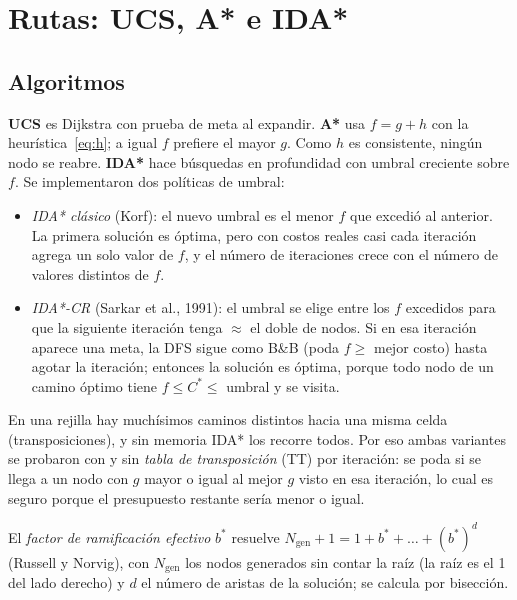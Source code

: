 \documentclass[11pt]{article}
\theoremstyle{remark}
\begin{document}
\section{Rutas: UCS, A* e IDA*}

\subsection{Algoritmos}
\textbf{UCS} es Dijkstra con prueba de meta al expandir. \textbf{A*} usa $f=g+h$ con la
heurística~\eqref{eq:h}; a igual $f$ prefiere el mayor $g$. Como $h$ es consistente, ningún nodo se
reabre. \textbf{IDA*} hace búsquedas en profundidad con umbral creciente sobre $f$. Se implementaron
dos políticas de umbral:
\begin{itemize}
\item \emph{IDA* clásico} (Korf): el nuevo umbral es el menor $f$ que excedió al anterior. La primera
solución es óptima, pero con costos reales casi cada iteración agrega un solo valor de $f$, y el
número de iteraciones crece con el número de valores distintos de $f$.
\item \emph{IDA*-CR} (Sarkar et al., 1991): el umbral se elige entre los $f$ excedidos para que la
siguiente iteración tenga $\approx$ el doble de nodos. Si en esa iteración aparece una meta, la DFS
sigue como B\&B (poda $f\ge$ mejor costo) hasta agotar la iteración; entonces la solución es óptima,
porque todo nodo de un camino óptimo tiene $f\le C^*\le$ umbral y se visita.
\end{itemize}
En una rejilla hay muchísimos caminos distintos hacia una misma celda (transposiciones), y sin
memoria IDA* los recorre todos. Por eso ambas variantes se probaron con y sin \emph{tabla de
transposición} (TT) por iteración: se poda si se llega a un nodo con $g$ mayor o igual al mejor $g$
visto en esa iteración, lo cual es seguro porque el presupuesto restante sería menor o igual.

El \emph{factor de ramificación efectivo} $b^*$ resuelve $N_{\text{gen}}+1=1+b^*+\dots+(b^*)^d$
(Russell y Norvig), con $N_{\text{gen}}$ los nodos generados sin contar la raíz (la raíz es el 1 del
lado derecho) y $d$ el número de aristas de la solución; se calcula por bisección.
\end{document}
